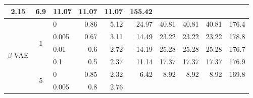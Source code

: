 \begin{table}[htbp]
\begin{tabular}{|c|clrrrrrrr|}
      \cellcolor[rgb]{ .953,  .922,  .604}2.15 &
      \cellcolor[rgb]{ .773,  .867,  .565}6.9 &
      \cellcolor[rgb]{ .62,  .82,  .533}11.07 &
      \cellcolor[rgb]{ .62,  .82,  .533}11.07 &
      \cellcolor[rgb]{ .62,  .82,  .533}11.07 &
      \cellcolor[rgb]{ .804,  .882,  .953}155.42
      \\
    \midrule
    \multirow{12}[6]{*}{$\beta$-VAE} &
      \multirow{4}[2]{*}{1} &
      0 &
      \cellcolor[rgb]{ .996,  .937,  .612}0.86 &
      \cellcolor[rgb]{ .933,  .918,  .6}5.12 &
      \cellcolor[rgb]{ .631,  .824,  .533}24.97 &
      \cellcolor[rgb]{ .388,  .745,  .482}40.81 &
      \cellcolor[rgb]{ .388,  .745,  .482}40.81 &
      \cellcolor[rgb]{ .388,  .745,  .482}40.81 &
      176.4
      \\
     &
       &
      0.005 &
      \cellcolor[rgb]{ 1,  .937,  .612}0.67 &
      \cellcolor[rgb]{ .961,  .925,  .604}3.11 &
      \cellcolor[rgb]{ .788,  .871,  .569}14.49 &
      \cellcolor[rgb]{ .659,  .831,  .541}23.22 &
      \cellcolor[rgb]{ .659,  .831,  .541}23.22 &
      \cellcolor[rgb]{ .659,  .831,  .541}23.22 &
      \cellcolor[rgb]{ .608,  .761,  .902}178.8
      \\
     &
       &
      0.01 &
      \cellcolor[rgb]{ 1,  .937,  .612}0.6 &
      \cellcolor[rgb]{ .969,  .929,  .608}2.72 &
      \cellcolor[rgb]{ .796,  .875,  .569}14.19 &
      \cellcolor[rgb]{ .627,  .82,  .533}25.28 &
      \cellcolor[rgb]{ .627,  .82,  .533}25.28 &
      \cellcolor[rgb]{ .627,  .82,  .533}25.28 &
      \cellcolor[rgb]{ .953,  .973,  .988}176.7
      \\
     &
       &
      0.1 &
      \cellcolor[rgb]{ 1,  .937,  .612}0.5 &
      \cellcolor[rgb]{ .973,  .929,  .608}2.37 &
      \cellcolor[rgb]{ .839,  .89,  .58}11.14 &
      \cellcolor[rgb]{ .745,  .859,  .561}17.37 &
      \cellcolor[rgb]{ .745,  .859,  .561}17.37 &
      \cellcolor[rgb]{ .745,  .859,  .561}17.37 &
      \cellcolor[rgb]{ .922,  .953,  .98}176.9
      \\
\cmidrule{2-10}     &
      \multirow{4}[2]{*}{5} &
      0 &
      \cellcolor[rgb]{ 1,  .937,  .612}0.85 &
      \cellcolor[rgb]{ .953,  .925,  .604}2.32 &
      \cellcolor[rgb]{ .827,  .886,  .576}6.42 &
      \cellcolor[rgb]{ .749,  .859,  .561}8.92 &
      \cellcolor[rgb]{ .749,  .859,  .561}8.92 &
      \cellcolor[rgb]{ .749,  .859,  .561}8.92 &
      \cellcolor[rgb]{ .902,  .941,  .976}169.8
      \\
     &
       &
      0.005 &
      \cellcolor[rgb]{ 1,  .937,  .612}0.8 &
      \cellcolor[rgb]{ .941,  .922,  .6}2.76 &

\end{tabular}
\end{table}
